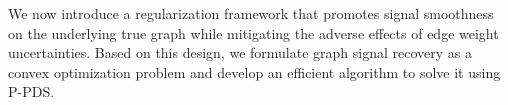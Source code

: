 We now introduce a regularization framework that promotes signal smoothness on the underlying true graph while mitigating the adverse effects of edge weight uncertainties. 
Based on this design, we formulate graph signal recovery as a convex optimization problem and develop an efficient algorithm to solve it using P-PDS.